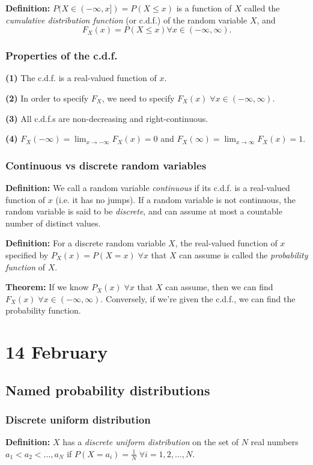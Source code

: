 \documentclass[12pt]{article}
\begin{document}
\textbf{Definition:} $P(X \in (-\infty, x]) = P(X \leq x)$ is a function of $X$ called the \emph{cumulative distribution function} (or c.d.f.) of the random variable $X$, and
\[
    F_X (x) = P(X \leq x) \forall x \in (-\infty, \infty).
\]

\subsubsection{Properties of the c.d.f.}
\textbf{(1)} The c.d.f. is a real-valued function of $x$.

\textbf{(2)} In order to specify $F_X$, we need to specify $F_X (x) \; \forall x \in (-\infty, \infty)$.

\textbf{(3)} All c.d.f.s are non-decreasing and right-continuous.

\textbf{(4)} $F_X (-\infty) = \lim_{x \to -\infty} F_X (x) = 0$ and $F_X (\infty) = \lim_{x \to \infty} F_X (x) = 1$.

\subsubsection{Continuous vs discrete random variables}
\textbf{Definition:} We call a random variable \emph{continuous} if its c.d.f. is a real-valued function of $x$ (i.e. it has no jumps). If a random variable is not continuous, the random variable is said to be \emph{discrete}, and can assume at most a countable number of distinct values.

\textbf{Definition:} For a discrete random variable $X$, the real-valued function of $x$ specified by $P_X (x) = P(X = x) \; \forall x$ that $X$ can assume is called the \emph{probability function} of $X$.

\textbf{Theorem:} If we know $P_X (x) \; \forall x$ that $X$ can assume, then we can find $F_X (x) \; \forall x \in (-\infty, \infty)$. Conversely, if we're given the c.d.f., we can find the probability function.

\section{14 February} 
\subsection{Named probability distributions}
\subsubsection{Discrete uniform distribution}
\textbf{Definition:} $X$ has a \emph{discrete uniform distribution} on the set of $N$ real numbers $a_1 < a_2 < \dots, a_N$ if $P(X = a_i) = \frac{1}{N} \; \forall i = 1, 2, \dots, N$.
\end{document}
